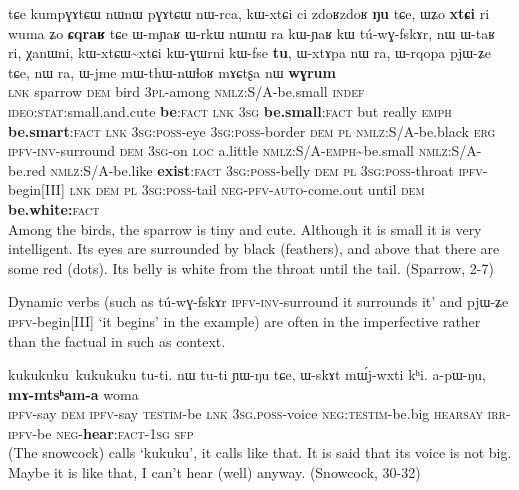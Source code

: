\documentclass[oldfontcommands,oneside,a4paper,11pt]{article}
\newcommand{\ipa}[1]{{\phon \mbox{#1}}} %
\begin{document}
\begin{exe}
\ex \label{ex:kumpGAtCW}
\gll
\ipa{tɕe} 	\ipa{kumpɣɤtɕɯ} 	\ipa{nɯnɯ} 	\ipa{pɣɤtɕɯ} 	\ipa{nɯ-rca,} 
 \ipa{kɯ-xtɕi} 	\ipa{ci} 	\ipa{zdoʁzdoʁ} 	\ipa{\textbf{ŋu}} 	\ipa{tɕe,}  \ipa{ɯʑo} 	\ipa{\textbf{xtɕi}} 	\ipa{ri} 	\ipa{wuma} 	\ipa{ʑo} 	\ipa{\textbf{ɕqraʁ}} \ipa{tɕe}  	\ipa{ɯ-mɲaʁ} 	\ipa{ɯ-rkɯ} 	\ipa{nɯnɯ} 	\ipa{ra} \ipa{kɯ-ɲaʁ} 	\ipa{kɯ} 	\ipa{tú-wɣ-fskɤr,} 	 	\ipa{nɯ} 	\ipa{ɯ-taʁ} 	\ipa{ri,} 	\ipa{χanɯni,} 	\ipa{kɯ-xtɕɯ\textasciitilde{}xtɕi} 	\ipa{kɯ-ɣɯrni} 	\ipa{kɯ-fse} 	\ipa{\textbf{tu},}  	\ipa{ɯ-xtɤpa} 	\ipa{nɯ} \ipa{ra,} 	\ipa{ɯ-rqopa} 	\ipa{pjɯ-ʑe} 	\ipa{tɕe,} 	\ipa{nɯ} \ipa{ra,}  \ipa{ɯ-jme} 	\ipa{mɯ-thɯ-nɯɬoʁ} 	\ipa{mɤɕtʂa} 	\ipa{nɯ} 	\ipa{\textbf{wɣrum}} \\
\textsc{lnk} sparrow \textsc{dem} bird \textsc{3pl}-among \textsc{nmlz}:S/A-be.small \textsc{indef} \textsc{ideo:stat}:small.and.cute \textbf{be}:\textsc{fact} \textsc{lnk}  \textsc{3sg} \textbf{be.small}:\textsc{fact} but really \textsc{emph} \textbf{be.smart}:\textsc{fact}  \textsc{lnk}  \textsc{3sg:poss}-eye \textsc{3sg:poss}-border \textsc{dem}  \textsc{pl}  \textsc{nmlz}:S/A-be.black \textsc{erg} \textsc{ipfv-inv}-surround \textsc{dem} \textsc{3sg}-on \textsc{loc} a.little \textsc{nmlz}:S/A-\textsc{emph}\textasciitilde{}be.small \textsc{nmlz}:S/A-be.red \textsc{nmlz}:S/A-be.like \textbf{exist}:\textsc{fact} \textsc{3sg:poss}-belly \textsc{dem}  \textsc{pl}  \textsc{3sg:poss}-throat \textsc{ipfv}-begin[III] \textsc{lnk}   \textsc{dem}  \textsc{pl}  \textsc{3sg:poss}-tail \textsc{neg-pfv-auto}-come.out until \textsc{dem} \textbf{be.white:}\textsc{fact} \\
\glt Among the birds, the sparrow is tiny and cute. Although it is small it is very intelligent. Its eyes are surrounded by black (feathers), and above that there are some red (dots). Its belly is white from the throat until the tail. (Sparrow, 2-7)
\end{exe}

 Dynamic verbs (such as \ipa{tú-wɣ-fskɤr}  \textsc{ipfv-inv}-surround  it surrounds it' and \ipa{pjɯ-ʑe} \textsc{ipfv}-begin[III] `it begins' in the example) are often in the imperfective rather than the factual in such as context.

\begin{exe}
\ex \label{ex:mAmtshama}
\gll
\ipa{kukukuku kukukuku} 	\ipa{tu-ti.} 	\ipa{nɯ} 	\ipa{tu-ti} 	\ipa{ɲɯ-ŋu} 	\ipa{tɕe,} 	\ipa{ɯ-skɤt} 	\ipa{mɯ́j-wxti} 	\ipa{kʰi.} 	\ipa{a-pɯ-ŋu,} \ipa{\textbf{mɤ-mtsʰam-a}} 	\ipa{woma} \\
{ } \textsc{ipfv}-say \textsc{dem}  \textsc{ipfv}-say \textsc{testim}-be \textsc{lnk}  \textsc{3sg.poss}-voice \textsc{neg:testim}-be.big \textsc{hearsay} \textsc{irr-ipfv}-be \textsc{neg}-\textbf{hear}:\textsc{fact-1sg} \textsc{sfp} \\
\glt (The snowcock) calls `kukuku', it calls like that. It is said that its voice is not big. Maybe it is like that, I can't hear (well) anyway. (Snowcock, 30-32)
\end{exe}
\end{document}
